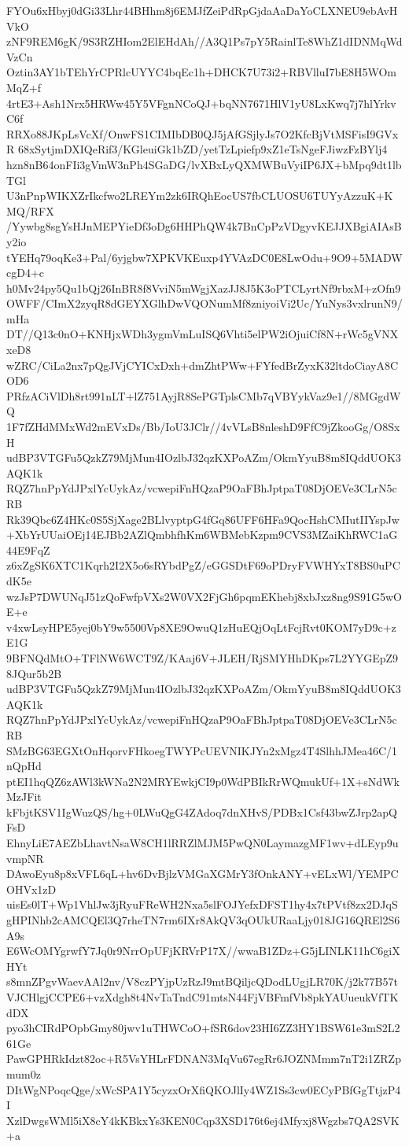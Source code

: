 FYOu6xHbyj0dGi33Lhr44BHhm8j6EMJfZeiPdRpGjdaAaDaYoCLXNEU9ebAvHVkO
zNF9REM6gK/9S3RZHIom2ElEHdAh//A3Q1Ps7pY5RainlTe8WhZ1dIDNMqWdVzCn
Oztin3AY1bTEhYrCPRlcUYYC4bqEc1h+DHCK7U73i2+RBVlluI7bE8H5WOmMqZ+f
4rtE3+Ash1Nrx5HRWw45Y5VFgnNCoQJ+bqNN7671HlV1yU8LxKwq7j7hlYrkvC6f
RRXo88JKpLsVcXf/OnwFS1CIMIbDB0QJ5jAfGSjlyJs7O2KfcBjVtMSFisI9GVxR
68xSytjmDXIQeRif3/KGleuiGk1bZD/yetTzLpiefp9xZ1eTsNgeFJiwzFzBYlj4
hzn8nB64onFIi3gVmW3nPh4SGaDG/lvXBxLyQXMWBuVyiIP6JX+bMpq9dt1lbTGl
U3nPnpWIKXZrIkcfwo2LREYm2zk6IRQhEocUS7fbCLUOSU6TUYyAzzuK+KMQ/RFX
/Yywbg8sgYsHJnMEPYieDf3oDg6HHPhQW4k7BnCpPzVDgyvKEJJXBgiAIAsBy2io
tYEHq79oqKe3+Pal/6yjgbw7XPKVKEuxp4YVAzDC0E8LwOdu+9O9+5MADWcgD4+c
h0Mv24py5Qu1bQj26InBR8f8VviN5mWgjXazJJ8J5K3oPTCLyrtNf9rbxM+zOfn9
OWFF/CImX2zyqR8dGEYXGlhDwVQONumMf8zniyoiVi2Uc/YuNys3vxlrunN9/mHa
DT//Q13c0nO+KNHjxWDh3ygmVmLuISQ6Vhti5elPW2iOjuiCf8N+rWc5gVNXxeD8
wZRC/CiLa2nx7pQgJVjCYICxDxh+dmZhtPWw+FYfedBrZyxK32ltdoCiayA8COD6
PRfzACiVlDh8rt991nLT+lZ751AyjR8SePGTplsCMb7qVBYykVaz9e1//8MGgdWQ
1F7fZHdMMxWd2mEVxDs/Bb/IoU3JClr//4vVLsB8nleshD9FfC9jZkooGg/O8SxH
udBP3VTGFu5QzkZ79MjMun4IOzlbJ32qzKXPoAZm/OkmYyuB8m8IQddUOK3AQK1k
RQZ7hnPpYdJPxlYcUykAz/vcwepiFnHQzaP9OaFBhJptpaT08DjOEVe3CLrN5cRB
Rk39Qbc6Z4HKc0S5SjXage2BLlvyptpG4fGq86UFF6HFa9QocHshCMIutIIYspJw
+XbYrUUaiOEj14EJBb2AZlQmbhfhKm6WBMebKzpm9CVS3MZaiKhRWC1aG44E9FqZ
z6xZgSK6XTC1Kqrh2I2X5o6sRYbdPgZ/eGGSDtF69oPDryFVWHYxT8BS0uPCdK5e
wzJsP7DWUNqJ51zQoFwfpVXs2W0VX2FjGh6pqmEKhebj8xbJxz8ng9S91G5wOE+e
v4xwLsyHPE5yej0bY9w5500Vp8XE9OwuQ1zHuEQjOqLtFcjRvt0KOM7yD9c+zE1G
9BFNQdMtO+TFlNW6WCT9Z/KAaj6V+JLEH/RjSMYHhDKps7L2YYGEpZ98JQur5b2B
udBP3VTGFu5QzkZ79MjMun4IOzlbJ32qzKXPoAZm/OkmYyuB8m8IQddUOK3AQK1k
RQZ7hnPpYdJPxlYcUykAz/vcwepiFnHQzaP9OaFBhJptpaT08DjOEVe3CLrN5cRB
SMzBG63EGXtOnHqorvFHkoegTWYPcUEVNIKJYn2xMgz4T4SlhhJMea46C/1nQpHd
ptEI1hqQZ6zAWl3kWNa2N2MRYEwkjCI9p0WdPBIkRrWQmukUf+1X+sNdWkMzJFit
kFbjtKSV1IgWuzQS/hg+0LWuQgG4ZAdoq7dnXHvS/PDBx1Csf43bwZJrp2apQFsD
EhnyLiE7AEZbLhavtNsaW8CH1lRRZlMJM5PwQN0LaymazgMF1wv+dLEyp9uvmpNR
DAwoEyu8p8xVFL6qL+hv6DvBjlzVMGaXGMrY3fOnkANY+vELxWl/YEMPCOHVx1zD
uisEs0lT+Wp1VhlJw3jRyuFReWH2Nxa5slFOJYefxDFST1hy4x7tPVtf8zx2DJqS
gHPINhb2cAMCQEl3Q7rheTN7rm6IXr8AkQV3qOUkURaaLjy018JG16QREl2S6A9s
E6WcOMYgrwfY7Jq0r9NrrOpUFjKRVrP17X//wwaB1ZDz+G5jLINLK11hC6giXHYt
s8mnZPgvWaevAAl2nv/V8czPYjpUzRzJ9mtBQiljcQDodLUgjLR70K/j2k77B57t
VJCHlgjCCPE6+vzXdgh8t4NvTaTndC91mtsN44FjVBFmfVb8pkYAUueukVfTKdDX
pyo3hCIRdPOpbGmy80jwv1uTHWCoO+fSR6dov23HI6ZZ3HY1BSW61e3mS2L261Ge
PawGPHRkIdzt82oc+R5VsYHLrFDNAN3MqVu67egRr6JOZNMmm7nT2i1ZRZpmum0z
DItWgNPoqcQge/xWcSPA1Y5cyzxOrXfiQKOJlIy4WZ1Ss3cw0ECyPBfGgTtjzP4I
XzlDwgsWMl5iX8cY4kKBkxYs3KEN0Cqp3XSD176t6ej4Mfyxj8Wgzbs7QA2SVK+a
